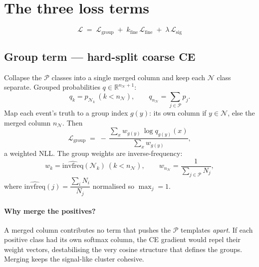 \documentclass[11pt]{article}
\newcommand{\Pset}{\mathcal{P}}
\newcommand{\Nset}{\mathcal{N}}
\newcommand{\invfreq}{\widehat{\mathrm{invfreq}}}
\begin{document}
\section{The three loss terms}
\begin{tcolorbox}[colback=black!3,colframe=black!50]
\begin{equation*}
\mathcal{L} \;=\; \mathcal{L}_\text{group} \;+\; k_\text{fine}\,\mathcal{L}_\text{fine}
\;+\; \lambda\,\mathcal{L}_\text{sig}
\end{equation*}
\end{tcolorbox}

\subsection{Group term --- hard-split coarse CE}
Collapse the $\Pset$ classes into a single merged column and keep each $\Nset$ class separate.
Grouped probabilities $q \in \mathbb{R}^{n_\Nset+1}$:
\begin{equation}
q_k = p_{\Nset_k}\ (k < n_\Nset), \qquad q_{n_\Nset} = \sum_{j \in \Pset} p_j .
\end{equation}
Map each event's truth to a group index $g(y)$: its own column if $y \in \Nset$, else the merged
column $n_\Nset$. Then
\begin{equation}
\mathcal{L}_\text{group} \;=\; -\,\frac{\sum_x w_{g(y)} \, \log q_{g(y)}(x)}{\sum_x w_{g(y)}} ,
\end{equation}
a weighted NLL. The group weights are inverse-frequency:
\begin{equation}
w_k = \invfreq(\Nset_k)\ (k<n_\Nset),
\qquad
w_{n_\Nset} = \frac{1}{\sum_{j\in\Pset} N_j},
\end{equation}
where $\invfreq(j) = \dfrac{\sum_i N_i}{N_j}$ normalised so $\max_j = 1$.

\paragraph{Why merge the positives?} A merged column contributes no term that pushes the $\Pset$
templates \emph{apart}. If each positive class had its own softmax column, the CE gradient would
repel their weight vectors, destabilising the very cosine structure that defines the groups.
Merging keeps the signal-like cluster cohesive.
\end{document}
